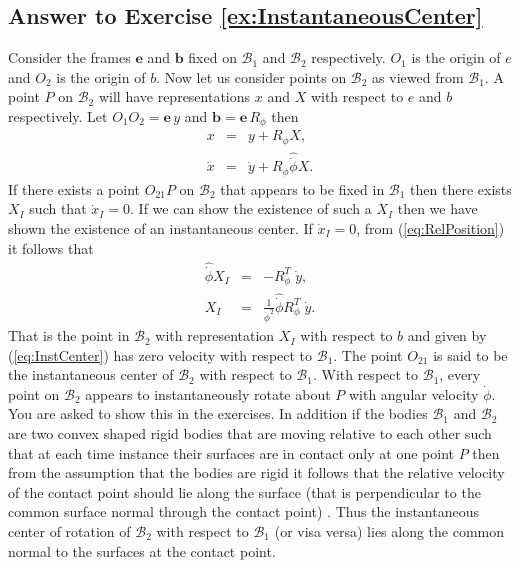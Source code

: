 \documentclass[graybox,envcountchap,sectrefs]{svmonoMuga}
\begin{document}
\subsection*{Answer to Exercise \ref{ex:InstantaneousCenter}}


Consider the frames $\mathbf{e}$ and $\mathbf{b}$ fixed on $\mathcal{B}_1$ and $\mathcal{B}_2$ 
respectively. $O_1$ is the origin of $e$ and $O_2$ is the origin of $b$. Now let us consider points on $\mathcal{B}_2$ as viewed from $\mathcal{B}_1$.
A point $P$ on $\mathcal{B}_2$ will have representations $x$ and $X$ with respect to $e$ and $b$ respectively. Let $O_1O_2=\mathbf{e}\,y$ and $\mathbf{b}=\mathbf{e}\,R_{\phi}$ then
\begin{eqnarray}
x &=& y+R_{\phi}X,\label{eq:RelPosition}\\
\dot{x} & = & \dot{y}+R_{\phi}\widehat{\dot{\phi}}X.\label{eq:RelPosition}
\end{eqnarray}
If there exists a point $O_{21}P$ on $\mathcal{B}_2$ that appears to be fixed in $\mathcal{B}_1$ then there exists $X_I$ such that $\dot{x}_I=0$. If we can show the existence of such 
a $X_I$ then we have shown the existence of an instantaneous center.
If $\dot{x}_I=0$, from (\ref{eq:RelPosition}) it follows that
\begin{eqnarray}
\widehat{\dot{\phi}}X_I &=& -R^T_{\phi}\;\dot{y},\\
X_I &=& \frac{1}{\dot{\phi}^2}\widehat{\dot{\phi}}R_{\phi}^T\;\dot{y}. \label{eq:InstCenter}
\end{eqnarray}
That is the point in $\mathcal{B}_2$ with representation $X_I$ with respect to $b$ and given by (\ref{eq:InstCenter}) has zero velocity with respect to $\mathcal{B}_1$. The point 
$O_{21}$ is said to be the instantaneous center of $\mathcal{B}_2$ with respect to $\mathcal{B}_1$. With respect to $\mathcal{B}_1$, every point on  $\mathcal{B}_2$ appears to 
instantaneously rotate about $P$ with angular velocity $\dot{\phi}$. You are asked to show this in the exercises.
In addition if the bodies $\mathcal{B}_1$ and $\mathcal{B}_2$ are two convex shaped rigid bodies that are moving relative to each other such that at each time instance their 
surfaces are in contact only at one point $P$ then  from the assumption that the bodies are rigid it follows that the relative velocity of the contact point should lie along the surface (that 
is perpendicular to the common surface normal through the contact point) . Thus the instantaneous center of rotation of $\mathcal{B}_2$ with respect to $\mathcal{B}_1$ (or visa 
versa) lies along the common normal to the surfaces at the contact point.
\end{document}
